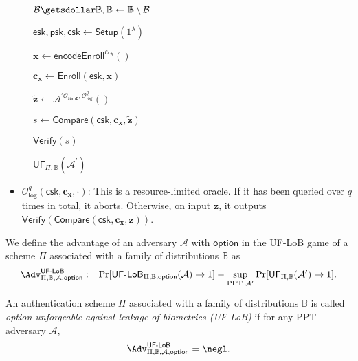 \begin{figure}[H]
\centering
	\begin{minipage}[t]{0.5\linewidth}
	\begin{algorithm}[H]
	\caption{$\textsf{UF}_{\Pi, \mathbb{B}}(\mathcal{A}^\prime)$}
	\label{alg:uf_game}
	\begin{algorithmic}[1]
		\State $\mathcal{B} \getsdollar \mathbb{B}, \mathbb{B} \gets \mathbb{B} \setminus \mathcal{B}$

		\State $\textsf{esk}, \textsf{psk}, \textsf{csk} \gets \textsf{Setup}(1^\lambda)$

		\State $\mathbf{x} \gets \textsf{encodeEnroll}^{\mathcal{O}_{\mathcal{B}}}()$

		\State $\mathbf{c_x} \gets \textsf{Enroll}(\textsf{esk}, \mathbf{x})$

		\State ${\mathbf{\tilde{z}}} \gets \mathcal{A}^{\prime \mathcal{O}_\textsf{samp}, \mathcal{O}_\textsf{log}^q }()$

		\State $s \gets \textsf{Compare}( \textsf{csk}, \mathbf{c_x}, \mathbf{\tilde{z}} )$

		\State \Return $\textsf{Verify}(s)$
	\end{algorithmic}
	\end{algorithm}
	\end{minipage}
\label{fig:uf_game}
\end{figure}

\begin{itemize}

	\item $\mathcal{O}_\textsf{log}^{q}(\textsf{csk}, \mathbf{c_x}, \cdot)$: This is a resource-limited oracle. If it has been queried over $q$ times in total, it aborts. Otherwise, on input $\mathbf{z}$, it outputs $\textsf{Verify}(\textsf{Compare}(\textsf{csk}, \mathbf{c_x}, \mathbf{z} ) )$.

\end{itemize}

We define the advantage of an adversary $\mathcal{A}$ with $\textsf{option}$ in the \textsf{UF-LoB} game of a scheme $\Pi$ associated with a family of distributions $\mathbb{B}$ as
\[
	\Adv^{\textsf{UF-LoB}}_{\Pi, \mathbb{B}, \mathcal{A}, \textsf{option}} := \Pr[{\textsf{UF-LoB}}_{\Pi, \mathbb{B}, \textsf{option}}(\mathcal{A}) \to 1] -
	\sup_{\text{PPT } \mathcal{A}^\prime} \Pr[\textsf{UF}_{\Pi, \mathbb{B}}(\mathcal{A}^\prime) \to 1].
\]

An authentication scheme $\Pi$ associated with a family of distributions $\mathbb{B}$ is called \emph{\textsf{option}-unforgeable against leakage of biometrics (UF-LoB)} if for any PPT adversary $\mathcal{A}$,
\[
	\Adv^{\textsf{UF-LoB}}_{\Pi, \mathbb{B}, \mathcal{A}, \textsf{option}} = \negl.
\]

